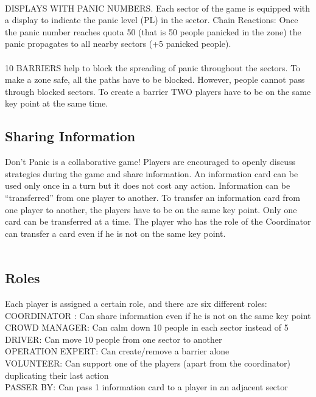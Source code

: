 \\
DISPLAYS WITH PANIC NUMBERS. Each sector of the game is equipped with a display to indicate the panic level (PL) in the sector. Chain Reactions: Once the panic number reaches quota 50 (that is 50 people panicked in the zone) the panic propagates to all nearby sectors (+5 panicked people). \\
\\
10 BARRIERS help to block the spreading of panic throughout the sectors. To make a zone safe, all the paths have to be blocked. However, people cannot pass through blocked sectors. To create a barrier TWO players have to be on the same key point at the same time. \\
%
%
\subsection*{Sharing Information}
Don’t Panic is a collaborative game! Players are encouraged to openly discuss strategies during the game and share information. An information card can be used only once in a turn but it does not cost any action. Information can be “transferred” from one player to another. To transfer an information card from one player to another, the players have to be on the same key point. Only one card can be transferred at a time. The player who has the role of the Coordinator can transfer a card even if he is not on the same key point. \\
\\
\subsection*{Roles}
Each player is assigned a certain role, and there are six different roles:\\
COORDINATOR : Can share information even if he is not on the same key point\\
CROWD MANAGER: Can calm down 10 people in each sector instead of 5\\
DRIVER: Can move 10 people from one sector to another\\
OPERATION EXPERT: Can create/remove a barrier alone\\
VOLUNTEER: Can support one of the players (apart from the coordinator) duplicating their last action\\
PASSER BY: Can pass 1 information card to a player in an adjacent sector\\
\\
